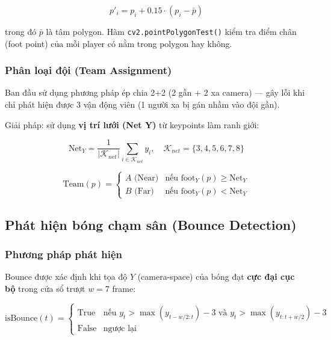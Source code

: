 \documentclass[12pt,a4paper]{article}
\begin{document}
\begin{equation}
p'_i = p_i + 0.15 \cdot (p_i - \bar{p})
\end{equation}

trong đó $\bar{p}$ là tâm polygon. Hàm \texttt{cv2.pointPolygonTest()} kiểm tra điểm chân (foot point) của mỗi player có nằm trong polygon hay không.

\subsubsection{Phân loại đội (Team Assignment)}
Ban đầu sử dụng phương pháp ép chia 2+2 (2 gần + 2 xa camera) --- gây lỗi khi chỉ phát hiện được 3 vận động viên (1 người xa bị gán nhầm vào đội gần).

Giải pháp: sử dụng \textbf{vị trí lưới (Net Y)} từ keypoints làm ranh giới:

\begin{equation}
\text{Net}_Y = \frac{1}{|\mathcal{K}_{net}|} \sum_{i \in \mathcal{K}_{net}} y_i, \quad \mathcal{K}_{net} = \{3,4,5,6,7,8\}
\end{equation}

\begin{equation}
\text{Team}(p) = \begin{cases}
    A \text{ (Near)} & \text{nếu } \text{foot}_Y(p) \geq \text{Net}_Y \\
    B \text{ (Far)}  & \text{nếu } \text{foot}_Y(p) < \text{Net}_Y
\end{cases}
\end{equation}

\subsection{Phát hiện bóng chạm sân (Bounce Detection)}
\label{sec:bounce_detection}

\subsubsection{Phương pháp phát hiện}
Bounce được xác định khi tọa độ $Y$ (camera-space) của bóng đạt \textbf{cực đại cục bộ} trong cửa sổ trượt $w = 7$ frame:

\begin{equation}
\text{isBounce}(t) = \begin{cases}
    \text{True} & \text{nếu } y_t > \max(y_{t-w/2:t}) - 3 \text{ và } y_t > \max(y_{t:t+w/2}) - 3 \\
    \text{False} & \text{ngược lại}
\end{cases}
\end{equation}
\end{document}
